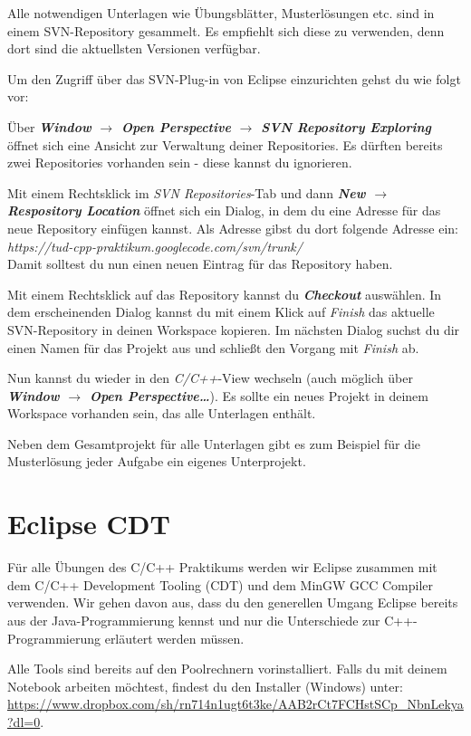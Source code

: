 Alle notwendigen Unterlagen wie Übungsblätter, Musterlösungen etc. sind in einem SVN-Repository gesammelt. Es empfiehlt sich diese zu verwenden, denn dort sind die aktuellsten Versionen verfügbar. 

Um den Zugriff über das SVN-Plug-in von Eclipse einzurichten gehst du wie folgt vor:

Über \textbf{\emph{Window $\rightarrow$ Open Perspective $\rightarrow$ SVN Repository Exploring}} öffnet sich eine Ansicht zur Verwaltung deiner Repositories. Es dürften bereits zwei Repositories vorhanden sein - diese kannst du ignorieren. 

Mit einem Rechtsklick im \emph{SVN Repositories}-Tab und dann \textbf{\emph{New $\rightarrow$ Respository Location}} öffnet sich ein Dialog, in dem du eine Adresse für das neue Repository einfügen kannst. Als Adresse gibst du dort folgende Adresse ein:\\[2ex] \emph{https://tud-cpp-praktikum.googlecode.com/svn/trunk/}\\[2ex]
Damit solltest du nun einen neuen Eintrag für das Repository haben.

Mit einem Rechtsklick auf das Repository kannst du \emph{\textbf{Checkout}} auswählen. In dem erscheinenden Dialog kannst du mit einem Klick auf \emph{Finish} das aktuelle SVN-Repository in deinen Workspace kopieren. Im nächsten Dialog suchst du dir einen Namen für das Projekt aus und schließt den Vorgang mit \emph{Finish} ab.

Nun kannst du wieder in den \emph{C/C++}-View wechseln (auch möglich über \textbf{\emph{Window $\rightarrow$ Open Perspective\dots}}). Es sollte ein neues Projekt in deinem Workspace vorhanden sein, das alle Unterlagen enthält.

Neben dem Gesamtprojekt für alle Unterlagen gibt es zum Beispiel für die Musterlösung jeder Aufgabe ein eigenes Unterprojekt.

\section{Eclipse CDT}

Für alle Übungen des C/C++ Praktikums werden wir Eclipse zusammen mit dem C/C++ Development Tooling (CDT) und dem MinGW GCC Compiler verwenden.
Wir gehen davon aus, dass du den generellen Umgang Eclipse bereits aus der Java-Programmierung kennst und nur die Unterschiede zur C++-Programmierung erläutert werden müssen.

Alle Tools sind bereits auf den Poolrechnern vorinstalliert.
Falls du mit deinem Notebook arbeiten möchtest, findest du den Installer (Windows) unter: \url{https://www.dropbox.com/sh/rn714n1ugt6t3ke/AAB2rCt7FCHstSCp_NbnLekya?dl=0}.

